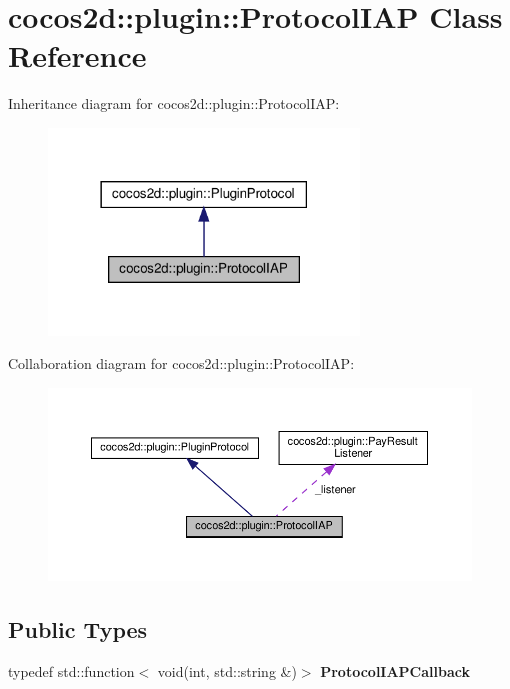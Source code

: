 \hypertarget{classcocos2d_1_1plugin_1_1ProtocolIAP}{}\section{cocos2d\+:\+:plugin\+:\+:Protocol\+I\+AP Class Reference}
\label{classcocos2d_1_1plugin_1_1ProtocolIAP}


Inheritance diagram for cocos2d\+:\+:plugin\+:\+:Protocol\+I\+AP\+:
\nopagebreak
\begin{figure}[H]
\begin{center}
\leavevmode
\includegraphics[width=234pt]{classcocos2d_1_1plugin_1_1ProtocolIAP__inherit__graph}
\end{center}
\end{figure}


Collaboration diagram for cocos2d\+:\+:plugin\+:\+:Protocol\+I\+AP\+:
\nopagebreak
\begin{figure}[H]
\begin{center}
\leavevmode
\includegraphics[width=350pt]{classcocos2d_1_1plugin_1_1ProtocolIAP__coll__graph}
\end{center}
\end{figure}
\subsection*{Public Types}
\begin{DoxyCompactItemize}
\item 
\mbox{\label{classcocos2d_1_1plugin_1_1ProtocolIAP_a0e860275e47aed6225b04899efd8ee9b}} 
typedef std\+::function$<$ void(int, std\+::string \&)$>$ {\bfseries Protocol\+I\+A\+P\+Callback}
\end{DoxyCompactItemize}
